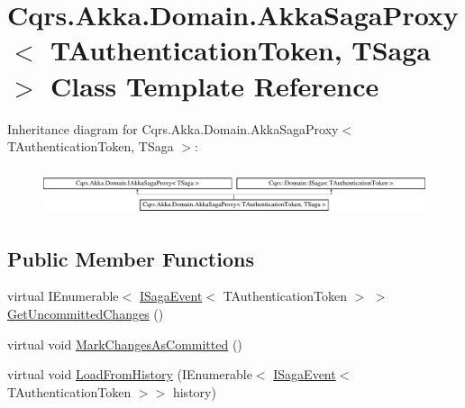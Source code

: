 \hypertarget{classCqrs_1_1Akka_1_1Domain_1_1AkkaSagaProxy}{}\section{Cqrs.\+Akka.\+Domain.\+Akka\+Saga\+Proxy$<$ T\+Authentication\+Token, T\+Saga $>$ Class Template Reference}
\label{classCqrs_1_1Akka_1_1Domain_1_1AkkaSagaProxy}
Inheritance diagram for Cqrs.\+Akka.\+Domain.\+Akka\+Saga\+Proxy$<$ T\+Authentication\+Token, T\+Saga $>$\+:\begin{figure}[H]
\begin{center}
\leavevmode
\includegraphics[height=1.372549cm]{classCqrs_1_1Akka_1_1Domain_1_1AkkaSagaProxy}
\end{center}
\end{figure}
\subsection*{Public Member Functions}
\begin{DoxyCompactItemize}
\item 
virtual I\+Enumerable$<$ \hyperlink{interfaceCqrs_1_1Events_1_1ISagaEvent}{I\+Saga\+Event}$<$ T\+Authentication\+Token $>$ $>$ \hyperlink{classCqrs_1_1Akka_1_1Domain_1_1AkkaSagaProxy_a8cad3415bc5474a01bfdb2db3a852ea5}{Get\+Uncommitted\+Changes} ()
\item 
virtual void \hyperlink{classCqrs_1_1Akka_1_1Domain_1_1AkkaSagaProxy_a5a5c012bc0f7f957b8bd2298956ca9ae}{Mark\+Changes\+As\+Committed} ()
\item 
virtual void \hyperlink{classCqrs_1_1Akka_1_1Domain_1_1AkkaSagaProxy_a21b69799b046c1fcdf5b2443699dee0c}{Load\+From\+History} (I\+Enumerable$<$ \hyperlink{interfaceCqrs_1_1Events_1_1ISagaEvent}{I\+Saga\+Event}$<$ T\+Authentication\+Token $>$$>$ history)
\end{DoxyCompactItemize}
